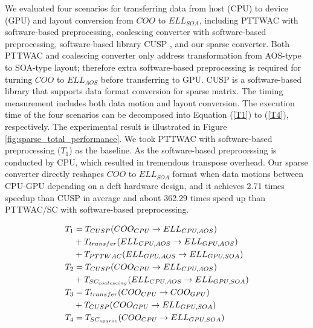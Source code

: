 \documentclass[10pt,journal,compsoc]{IEEEtran}
\begin{document}
We evaluated four scenarios for transferring data from host (CPU) to device (GPU) and layout conversion from $ COO $ to $ ELL_{SOA} $, including
PTTWAC with software-based preprocessing, coalescing converter with software-based preprocessing, software-based library CUSP \cite{Cusp}, and our sparse converter.
Both PTTWAC and coalescing converter only address transformation from AOS-type to SOA-type layout; therefore extra software-based preprocessing is required for turning $ COO $ to $ ELL_{AOS} $ before transferring to GPU.
CUSP is a software-based library that supports data format conversion for sparse matrix.
The timing measurement includes both data motion and layout conversion.
The execution time of the four scenarios can be decomposed into Equation (\ref{T1}) to (\ref{T4}), respectively.
The experimental result is illustrated in Figure \ref{fig:sparse_total_performance}. We took PTTWAC with software-based preprocessing ($T_{1} $) as the baseline.
As the software-based preprocessing is conducted by CPU, which resulted in tremendous transpose overhead.
Our sparse converter directly reshapes $ COO $ to $ ELL_{SOA} $ format when data motions between CPU-GPU depending on a deft hardware design, and it achieves 2.71 times speedup than CUSP in average and about
362.29 times speed up than PTTWAC/SC with software-based preprocessing.

\begin{align}
\footnotesize
 T_{1}& =
  T_{CUSP}(COO_{CPU}\rightarrow ELL_{CPU,AOS})\notag \\
  &+ T_{transfer}(ELL_{CPU,AOS}\rightarrow ELL_{GPU,AOS}) \notag \\
  &+ T_{PTTWAC}(ELL_{GPU,AOS}\rightarrow ELL_{GPU,SOA})
  \label{T1}\\
 T_{2}& =
  T_{CUSP}(COO_{CPU}\rightarrow ELL_{CPU,AOS})\notag \\
  &+ T_{SC_{coalescing}}(ELL_{CPU,AOS}\rightarrow ELL_{GPU,SOA})
  \label{T2}\\
  T_{3}& =
  T_{transfer}(COO_{CPU}\rightarrow COO_{GPU}) \notag \\
  &+ T_{CUSP}(COO_{GPU}\rightarrow ELL_{GPU,SOA})
    \label{T3}\\
  T_{4}& =
  T_{SC_{sparse}}(COO_{CPU}\rightarrow ELL_{GPU,SOA})
   \label{T4}
 \end{align}
\end{document}
